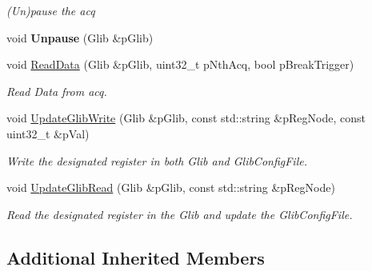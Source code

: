 \begin{DoxyCompactItemize}
\begin{DoxyCompactList}\small\item\em (Un)pause the acq \end{DoxyCompactList}\item 
\hypertarget{class_ph2___hw_interface_1_1_glib_interface_a4d6568c22d8e3777ee909db37b3b01d6}{void {\bfseries Unpause} (Glib \&p\-Glib)}\label{class_ph2___hw_interface_1_1_glib_interface_a4d6568c22d8e3777ee909db37b3b01d6}

\item 
void \hyperlink{class_ph2___hw_interface_1_1_glib_interface_ad3f91f03b0214987f4a9e8b63ff99dca}{Read\-Data} (Glib \&p\-Glib, uint32\-\_\-t p\-Nth\-Acq, bool p\-Break\-Trigger)
\begin{DoxyCompactList}\small\item\em Read Data from acq. \end{DoxyCompactList}\item 
\hypertarget{class_ph2___hw_interface_1_1_glib_interface_afeda624fe12657712e9f10cd60603d8a}{void \hyperlink{class_ph2___hw_interface_1_1_glib_interface_afeda624fe12657712e9f10cd60603d8a}{Update\-Glib\-Write} (Glib \&p\-Glib, const std\-::string \&p\-Reg\-Node, const uint32\-\_\-t \&p\-Val)}\label{class_ph2___hw_interface_1_1_glib_interface_afeda624fe12657712e9f10cd60603d8a}

\begin{DoxyCompactList}\small\item\em Write the designated register in both Glib and Glib\-Config\-File. \end{DoxyCompactList}\item 
\hypertarget{class_ph2___hw_interface_1_1_glib_interface_a1ab42500cf3f6369a8eb2404ef8cd85b}{void \hyperlink{class_ph2___hw_interface_1_1_glib_interface_a1ab42500cf3f6369a8eb2404ef8cd85b}{Update\-Glib\-Read} (Glib \&p\-Glib, const std\-::string \&p\-Reg\-Node)}\label{class_ph2___hw_interface_1_1_glib_interface_a1ab42500cf3f6369a8eb2404ef8cd85b}

\begin{DoxyCompactList}\small\item\em Read the designated register in the Glib and update the Glib\-Config\-File. \end{DoxyCompactList}\end{DoxyCompactItemize}
\subsection*{Additional Inherited Members}


